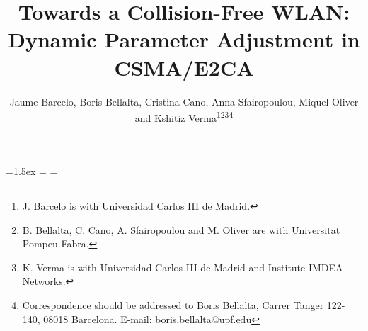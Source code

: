 \documentclass[journal]{IEEEtran}
\begin{document}
\newdimen\snellbaselineskip
\newdimen\snellskip
\snellskip=1.5ex
\snellbaselineskip=\baselineskip
\def\srule{\omit\kern.5em\vrule\kern-.5em}
\newbox\bigstrutbox
\setbox\bigstrutbox=\hbox{\vrule height14.5pt depth9.5pt width0pt}
\def\bigstrut{\relax\ifmmode\copy\bigstrutbox\else\unhcopy\bigstrutbox\fi}
\def\middlehrule#1#2{\noalign{\kern-\snellbaselineskip\kern\snellskip}
&\multispan#1\strut\hrulefill
&\omit\hbox to.5em{\hrulefill}\vrule 
height \snellskip\kern-.5em&\multispan#2\hrulefill\cr}

\makeatletter
\def\bordermatrix#1{\begingroup \m@th
  \@tempdima 8.75\p@
  \setbox\z@\vbox{\def\cr{\crcr\noalign{\kern2\p@\global\let\cr\endline}}\ialign{$##$\hfil\kern2\p@\kern\@tempdima&\thinspace\hfil$##$\hfil
      &&\quad\hfil$##$\hfil\crcr
      \omit\strut\hfil\crcr\noalign{\kern-\snellbaselineskip}#1\crcr\omit\strut\cr}}\setbox\tw@\vbox{\unvcopy\z@\global\setbox\@ne\lastbox}\setbox\tw@\hbox{\unhbox\@ne\unskip\global\setbox\@ne\lastbox}\setbox\tw@\hbox{$\kern\wd\@ne\kern-\@tempdima\left(\kern-\wd\@ne
    \global\setbox\@ne\vbox{\box\@ne\kern2\p@}\vcenter{\kern-\ht\@ne\unvbox\z@\kern-\snellbaselineskip}\,\right)$}\null\;\vbox{\kern\ht\@ne\box\tw@}\endgroup}
\makeatletter

\makeatletter
\def\bordermatrix#1{\begingroup \m@th
  \@tempdima 8.75\p@
  \setbox\z@\vbox{\def\cr{\crcr\noalign{\kern2\p@\global\let\cr\endline}}\ialign{$##$\hfil\kern2\p@\kern\@tempdima&\thinspace\hfil$##$\hfil
      &&\quad\hfil$##$\hfil\crcr
      \omit\strut\hfil\crcr\noalign{\kern-\snellbaselineskip}#1\crcr\omit\strut\cr}}\setbox\tw@\vbox{\unvcopy\z@\global\setbox\@ne\lastbox}\setbox\tw@\hbox{\unhbox\@ne\unskip\global\setbox\@ne\lastbox}\setbox\tw@\hbox{$\kern\wd\@ne\kern-\@tempdima\left(\kern-\wd\@ne
    \global\setbox\@ne\vbox{\box\@ne\kern2\p@}\vcenter{\kern-\ht\@ne\unvbox\z@\kern-\snellbaselineskip}\,\right)$}\null\;\vbox{\kern\ht\@ne\box\tw@}\endgroup}
\makeatletter

\title{Towards a Collision-Free WLAN: Dynamic Parameter Adjustment in CSMA/E2CA}


\author{
Jaume Barcelo, Boris Bellalta, Cristina Cano, Anna Sfairopoulou, Miquel Oliver and Kshitiz Verma\thanks{J. Barcelo is with Universidad Carlos III de Madrid.}\thanks{B. Bellalta, C. Cano, A. Sfairopoulou and M. Oliver are with Universitat Pompeu Fabra.}\thanks{K. Verma is with Universidad Carlos III de Madrid and Institute IMDEA Networks.}\thanks{Correspondence should be addressed to Boris Bellalta, Carrer Tanger 122-140, 08018 Barcelona. E-mail: boris.bellalta@upf.edu}
}
\end{document}
